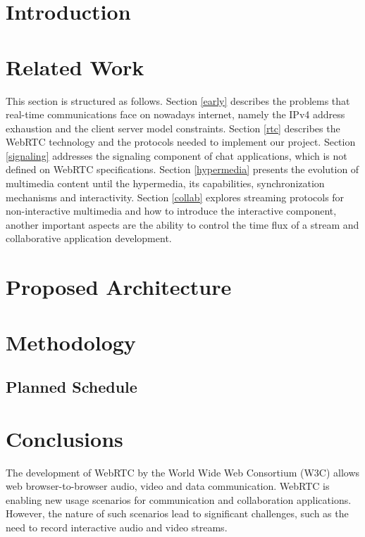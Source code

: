 \documentclass{llncs}
\begin{document}
\section{Introduction}
  

\section{Related Work}\label{related}
 This section is structured as follows.
 Section \ref{early} describes the problems that real-time communications face on nowadays internet, namely the \ac{IPv4} address exhaustion and the client server model constraints. 
 Section \ref{rtc} describes the \ac{WebRTC} technology and the protocols needed to implement our project. 
 Section \ref{signaling} addresses the signaling component of chat applications, which is not defined on \ac{WebRTC} specifications. 
 Section \ref{hypermedia} presents the evolution of multimedia content until the hypermedia, its capabilities, synchronization mechanisms and interactivity. 
 Section \ref{collab} explores streaming protocols for non-interactive multimedia and how to introduce the interactive component, another important aspects are the ability to control the time flux of a stream and collaborative application development.
        
  
  
  
  

\section{Proposed Architecture}\label{arch} %
  

\section{Methodology}\label{meth} %



		



	\subsection{Planned Schedule} %
		

\section{Conclusions}\label{concl} %
  The development of WebRTC by the World Wide Web Consortium (W3C) allows web browser-to-browser audio, video and data communication. WebRTC is enabling new usage scenarios for communication and collaboration applications. However, the nature of such scenarios lead to significant challenges, such as the need to record interactive audio and video streams.
\end{document}
